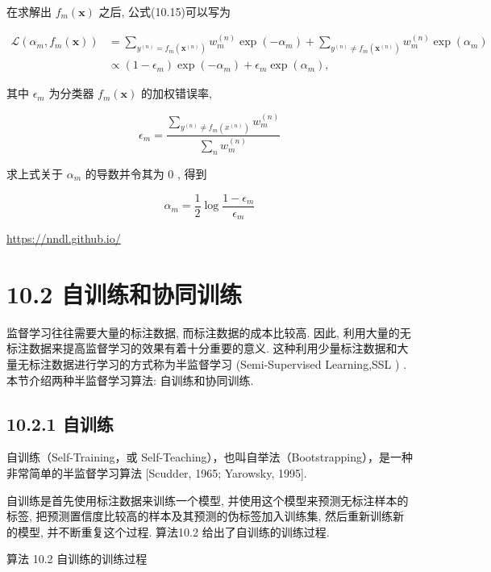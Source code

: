 \documentclass[10pt]{article}
\begin{document}
在求解出 $f_{m}(\boldsymbol{x})$ 之后, 公式(10.15)可以写为


\begin{align*}
\mathcal{L}\left(\alpha_{m}, f_{m}(\boldsymbol{x})\right) & =\sum_{y^{(n)}=f_{m}\left(\boldsymbol{x}^{(n)}\right)} w_{m}^{(n)} \exp \left(-\alpha_{m}\right)+\sum_{y^{(n)} \neq f_{m}\left(\boldsymbol{x}^{(n)}\right)} w_{m}^{(n)} \exp \left(\alpha_{m}\right)  \tag{10.19}\\
& \propto\left(1-\epsilon_{m}\right) \exp \left(-\alpha_{m}\right)+\epsilon_{m} \exp \left(\alpha_{m}\right), \tag{10.20}
\end{align*}


其中 $\epsilon_{m}$ 为分类器 $f_{m}(\boldsymbol{x})$ 的加权错误率,


\begin{equation*}
\epsilon_{m}=\frac{\sum_{y^{(n)} \neq f_{m}\left(x^{(n)}\right)} w_{m}^{(n)}}{\sum_{n} w_{m}^{(n)}} \tag{10.21}
\end{equation*}


求上式关于 $\alpha_{m}$ 的导数并令其为 0 , 得到


\begin{equation*}
\alpha_{m}=\frac{1}{2} \log \frac{1-\epsilon_{m}}{\epsilon_{m}} \tag{10.22}
\end{equation*}


\href{https://nndl.github.io/}{https://nndl.github.io/}

\section*{10.2 自训练和协同训练}
监督学习往往需要大量的标注数据, 而标注数据的成本比较高. 因此, 利用大量的无标注数据来提高监督学习的效果有着十分重要的意义. 这种利用少量标注数据和大量无标注数据进行学习的方式称为半监督学习 (Semi-Supervised Learning,SSL ) . 本节介绍两种半监督学习算法: 自训练和协同训练.

\subsection*{10.2.1 自训练}
自训练（Self-Training，或 Self-Teaching），也叫自举法（Bootstrapping），是一种非常简单的半监督学习算法 [Scudder, 1965; Yarowsky, 1995].

自训练是首先使用标注数据来训练一个模型, 并使用这个模型来预测无标注样本的标签, 把预测置信度比较高的样本及其预测的伪标签加入训练集, 然后重新训练新的模型, 并不断重复这个过程. 算法10.2 给出了自训练的训练过程.

算法 10.2 自训练的训练过程
\end{document}
